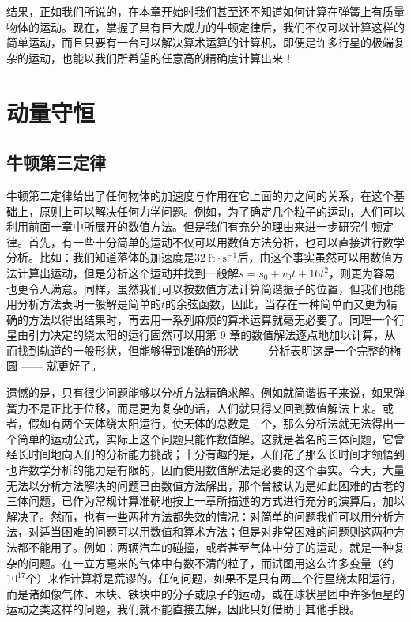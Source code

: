 \documentclass[12pt,oneside]{book}
\begin{document}
结果，正如我们所说的，在本章开始时我们甚至还不知道如何计算在弹簧上有质量物体的运动。现在，掌握了具有巨大威力的牛顿定律后，我们不仅可以计算这样的简单运动，而且只要有一台可以解决算术运算的计算机，即便是许多行星的极端复杂的运动，也能以我们所希望的任意高的精确度计算出来！


\chapter{动量守恒}
\section{牛顿第三定律}
牛顿第二定律给出了任何物体的加速度与作用在它上面的力之间的关系，在这个基础上，原则上可以解决任何力学问题。例如，为了确定几个粒子的运动，人们可以利用前面一章中所展开的数值方法。但是我们有充分的理由来进一步研究牛顿定律。首先，有一些十分简单的运动不仅可以用数值方法分析，也可以直接进行数学分析。比如：我们知道落体的加速度是$32\ \text{ft}\cdot\text{s}^{-1}$后，由这个事实虽然可以用数值方法计算出运动，但是分析这个运动并找到一般解$s = s_0 + v_0t + 16t^2$，则更为容易也更令人满意。同样，虽然我们可以按数值方法计算简谐振子的位置，但我们也能用分析方法表明一般解是简单的$t$的余弦函数，因此，当存在一种简单而又更为精确的方法以得出结果时，再去用一系列麻烦的算术运算就毫无必要了。同理一个行星由引力决定的绕太阳的运行固然可以用第 9 章的数值解法逐点地加以计算，从而找到轨道的一般形状，但能够得到准确的形状 —— 分析表明这是一个完整的椭圆 —— 就更好了。

遗憾的是，只有很少问题能够以分析方法精确求解。例如就简谐振子来说，如果弹簧力不是正比于位移，而是更为复杂的话，人们就只得又回到数值解法上来。或者，假如有两个天体绕太阳运行，使天体的总数是三个，那么分析法就无法得出一个简单的运动公式，实际上这个问题只能作数值解。这就是著名的三体问题，它曾经长时间地向人们的分析能力挑战；十分有趣的是，人们花了那么长时间才领悟到也许数学分析的能力是有限的，因而使用数值解法是必要的这个事实。今天，大量无法以分析方法解决的问题已由数值方法解出，那个曾被认为是如此困难的古老的三体问题，已作为常规计算准确地按上一章所描述的方式进行充分的演算后，加以解决了。然而，也有一些两种方法都失效的情况：对简单的问题我们可以用分析方法，对适当困难的问题可以用数值和算术方法；但是对非常困难的问题则这两种方法都不能用了。例如：两辆汽车的碰撞，或者甚至气体中分子的运动，就是一种复杂的问题。在一立方毫米的气体中有数不清的粒子，而试图用这么许多变量（约$10^{17}$个）来作计算将是荒谬的。任何问题，如果不是只有两三个行星绕太阳运行，而是诸如像气体、木块、铁块中的分子或原子的运动，或在球状星团中许多恒星的运动之类这样的问题，我们就不能直接去解，因此只好借助于其他手段。
\end{document}
